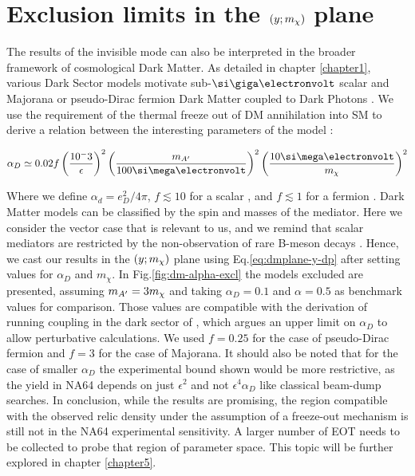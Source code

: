 \FloatBarrier
\section{Exclusion limits in the $(y;m_{\chi})$ plane}
\label{ch4:sec:exclusion-limits-y}

The results of the invisible mode can also be interpreted in the broader framework of cosmological Dark Matter. As detailed in chapter \ref{chapter1}, various Dark Sector models motivate sub-$\gev$ scalar and Majorana or pseudo-Dirac fermion Dark Matter coupled to Dark Photons \cite{battaglieri2017cosmic}. We use the requirement of the thermal freeze out of DM annihilation into SM to derive a relation between the interesting parameters of the model \cite{na64-prd}:

\begin{equation}
  \label{eq:ad-freeze-out}
  \alpha_D \simeq 0.02 f\left(\frac{10^-3}{\epsilon}\right)^2\left(\frac{m_{\DM}}{100 \mev}\right)^2\left(\frac{10 \mev}{m_{\chi}}\right)^2
\end{equation}

Where we define $\alpha_d = e^2_D/4\pi$, $f\lesssim 10$ for a scalar \cite{deNiverville:2011it}, and $f\lesssim 1$ for a fermion \cite{PhysRevD.91.094026}. Dark Matter models can be classified by the spin and masses of the mediator. Here we consider the vector case that is relevant to us, and we remind that scalar mediators are restricted by the non-observation of rare B-meson decays \cite{battaglieri2017cosmic}. Hence, we cast our results in the $(y;m_{\chi})$ plane using Eq.\ref{eq:dmplane-y-dp} after setting values for $\alpha_D$ and $m_{\chi}$. In Fig.\ref{fig:dm-alpha-excl} the models excluded are presented, assuming $m_{A'} = 3m_{\chi}$ and taking $\alpha_D=0.1$ and $\alpha=0.5$ as benchmark values for comparison. Those values are compatible with the derivation of running coupling in the dark sector of \cite{Davoudiasl:2015hxa}, which argues an upper limit on $\alpha_D$ to allow perturbative calculations. We used $f=0.25$ for the case of pseudo-Dirac fermion and $f=3$ for the case of Majorana. It should also be noted that for the case of smaller $\alpha_D$ the experimental bound shown would be more restrictive, as the yield in NA64 depends on just $\epsilon^2$ and not $\epsilon^4 \alpha_D$ like classical beam-dump searches. In conclusion, while the results are promising, the region compatible with the observed relic density under the assumption of a freeze-out mechanism is still not in the NA64 experimental sensitivity. A larger number of EOT needs to be collected to probe that region of parameter space. This topic will be further explored in chapter \ref{chapter5}.

